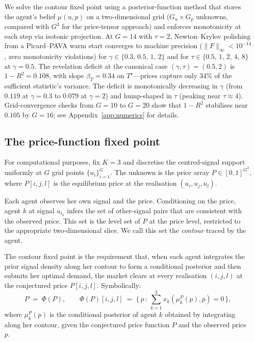 \documentclass[12pt,letterpaper]{article}
\theoremstyle{definition}
\theoremstyle{remark}
\newcommand{\Tstar}{T^{\!\star}}
\newcommand{\1}{\mathbf{1}}
\begin{document}
We solve the contour fixed point using a posterior-function method
that stores the agent's belief $\mu(u,p)$ on a two-dimensional grid
($G_{u}\!\times\!G_{p}$ unknowns, compared with $G^{3}$ for the
price-tensor approach) and enforces monotonicity at each step
via isotonic projection. At $G\!=\!14$ with
$\tau\!=\!2$, Newton--Krylov polishing from a Picard--PAVA warm start
converges to machine precision
($\|F\|_{\infty}\!<\!10^{-14}$, zero monotonicity violations) for
$\gamma\!\in\!\{0.3,\,0.5,\,1,\,2\}$ and for
$\tau\!\in\!\{0.5,\,1,\,2,\,4,\,8\}$ at $\gamma\!=\!0.5$. The
revelation deficit at the canonical case $(\gamma,\tau)\!=\!(0.5,2)$
is $1\!-\!R^{2}\!=\!0.108$, with slope $\beta_{T}\!=\!0.34$ on
$\Tstar$---prices capture only 34\% of the sufficient statistic's
variance. The deficit is monotonically decreasing in $\gamma$
(from $0.119$ at $\gamma\!=\!0.3$ to $0.079$ at $\gamma\!=\!2$)
and hump-shaped in $\tau$ (peaking near $\tau\!\approx\!4$).
Grid-convergence checks from $G\!=\!10$ to $G\!=\!20$ show that
$1\!-\!R^{2}$ stabilises near $0.105$ by $G\!=\!16$; see
Appendix~\ref{app:numerics} for details.

\subsection{The price-function fixed point}

For computational purposes, fix $K=3$ and discretise the centred-signal
support uniformly at $G$ grid points $\{u_{i}\}_{i=1}^{G}$. The unknown is
the price array
\(P\in[0,1]^{G^{3}}\), where $P[i,j,l]$ is the equilibrium price at the
realisation $(u_{i},u_{j},u_{l})$.

Each agent observes her own signal and the price. Conditioning on the price,
agent $k$ at signal $u_{i_{k}}$ infers the set of other-signal pairs that are
consistent with the observed price. This set is the level set of $P$ at the
price level, restricted to the appropriate two-dimensional slice. We call
this set the \emph{contour} traced by the agent.

The contour fixed point is the requirement that, when each agent integrates
the prior signal density along her contour to form a conditional posterior
and then submits her optimal demand, the market clears at every realisation
$(i,j,l)$ at the conjectured price $P[i,j,l]$. Symbolically:
\begin{equation}
   P \;=\; \Phi(P), \qquad
   \Phi(P)[i,j,l] \;=\;
   \bigl\{\,p\,:\,\textstyle\sum_{k=1}^{3} x_{k}(\mu_{k}^{P}(p),p)=0\,\bigr\},
\label{eq:fixed-point}
\end{equation}
where $\mu_{k}^{P}(p)$ is the conditional posterior of agent $k$ obtained by
integrating along her contour, given the conjectured price function $P$ and
the observed price $p$.
\end{document}
